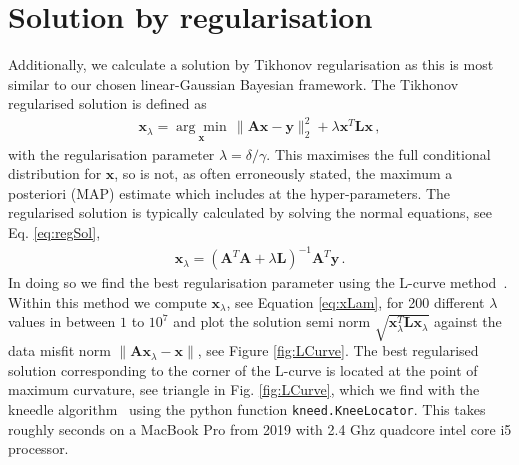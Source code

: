 \section{Solution by regularisation}
\label{subsec:reg}
Additionally, we calculate a solution by Tikhonov regularisation as this is most similar to our chosen linear-Gaussian Bayesian framework.
The Tikhonov regularised solution is defined as~\cite{hansen2010discrete} 
\begin{align}
	\bm{x}_{\lambda} =\underset{ \bm{x}}{\arg \min}\,  \lVert \bm{A}\bm{x} - \bm{y} \rVert_2^2 + \lambda \bm{x}^T \bm{L} \bm{x} \, ,
	\label{eq:XLam}
\end{align}
with the regularisation parameter $\lambda = \delta / \gamma$.
This maximises the full conditional distribution for $\bm{x}$, so is not, as often erroneously stated, the maximum a posteriori (MAP) estimate which includes at the hyper-parameters.
The regularised solution is typically calculated by solving the normal equations, see Eq. \ref{eq:regSol},
\begin{align}
	\bm{x}_{\lambda} = (\bm{A}^T\bm{A} + \lambda \bm{L} )^{-1} \bm{A}^T \bm{y} \label{eq:xLam} \, .
\end{align}
In doing so we find the best regularisation parameter using the L-curve method~\cite{hansen1993use}.
Within this method we compute $\bm{x}_\lambda$, see Equation \eqref{eq:xLam}, for 200 different $\lambda$ values in between $1$ to $10^7$ and plot the solution semi norm $\sqrt{\bm{x}_\lambda^T\mathbf{L} \bm{x}_\lambda}$ against the data misfit norm $\lVert \bm{A}\bm{x}_\lambda - \bm{x} \rVert$, see Figure \ref{fig:LCurve}. 
The best regularised solution corresponding to the corner of the L-curve is located at the point of maximum curvature, see triangle in Fig. \ref{fig:LCurve}, which we find with the kneedle algorithm~\cite{satopaa2011kneedle} using the python function \texttt{kneed.KneeLocator}.
This takes roughly seconds on a MacBook Pro from 2019 with 2.4 Ghz quadcore intel core i5 processor.
